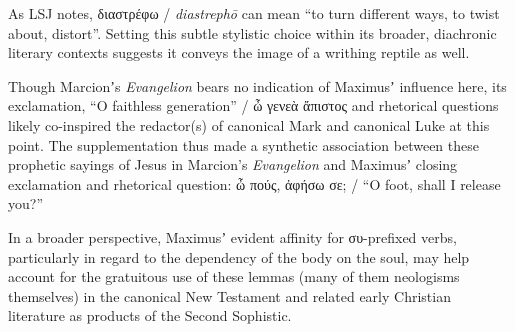 \noindent{}As LSJ notes, διαστρέφω / \textit{diastrephō} can mean “to turn different ways, to twist about, distort”. %
Setting this subtle stylistic choice within its broader, diachronic literary contexts %
suggests it conveys the image of a writhing reptile as well. %

Though Marcionʼs \textit{Evangelion} bears no indication of Maximusʼ influence here, %
its exclamation, “O faithless generation” / ὦ γενεὰ ἄπιστος and rhetorical questions %
likely co-inspired the redactor(s) of canonical Mark and canonical Luke at this point. %
The supplementation thus made a synthetic association between these prophetic sayings %
of Jesus in Marcion's \textit{Evangelion} and Maximusʼ closing exclamation and rhetorical question: %
ὦ πούς, ἀφήσω σε; / “O foot, shall I release you?” %

In a broader perspective, Maximusʼ evident affinity for συ-prefixed verbs, %
particularly in regard to the dependency of the body on the soul, %
may help account for the gratuitous use of these lemmas (many of them neologisms themselves) %
in the canonical New Testament and related early Christian literature %
as products of the Second Sophistic. %